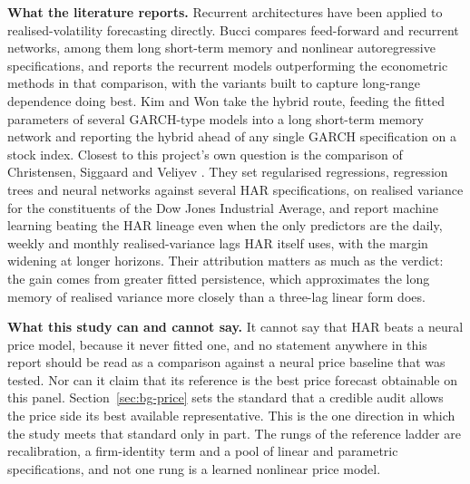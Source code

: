 \textbf{What the literature reports.} Recurrent architectures have been applied
to realised-volatility forecasting directly. Bucci \cite{bucci2020neural}
compares feed-forward and recurrent networks, among them long short-term memory
and nonlinear autoregressive specifications, and reports the recurrent models
outperforming the econometric methods in that comparison, with the variants
built to capture long-range dependence doing best. Kim and Won
\cite{kimwon2018lstmgarch} take the hybrid route, feeding the fitted parameters
of several GARCH-type models into a long short-term memory network and reporting
the hybrid ahead of any single GARCH specification on a stock index. Closest to
this project's own question is the comparison of Christensen, Siggaard and
Veliyev \cite{christensen2023mlvol}. They set regularised regressions, regression
trees and neural networks against several HAR specifications, on realised
variance for the constituents of the Dow Jones Industrial Average, and report
machine learning beating the HAR lineage even when the only predictors are the
daily, weekly and monthly realised-variance lags HAR itself uses, with the margin
widening at longer horizons. Their attribution matters as much as the verdict:
the gain comes from greater fitted persistence, which approximates the long
memory of realised variance more closely than a three-lag linear form does.

\textbf{What this study can and cannot say.} It cannot say that HAR beats a
neural price model, because it never fitted one, and no statement anywhere in
this report should be read as a comparison against a neural price baseline that
was tested. Nor can it claim that its reference is the best price forecast
obtainable on this panel. Section~\ref{sec:bg-price} sets the standard that a
credible audit allows the price side its best available representative. This is
the one direction in which the study meets that standard only in part. The rungs
of the reference ladder are recalibration, a firm-identity term and a pool of
linear and parametric specifications, and not one rung is a learned nonlinear
price model.

